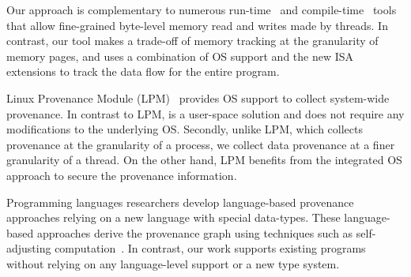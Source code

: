  Our approach is complementary to numerous run-time~\cite{memtrace} and compile-time~\cite{cgo-compiler-provenance} tools that allow fine-grained byte-level memory read and writes made by threads. In contrast, our tool makes a trade-off of memory tracking at the granularity of memory pages, and uses a combination of OS support and the new ISA extensions to track the data flow for the entire program. 


 Linux Provenance Module (LPM)~\cite{lpm} provides OS support to collect system-wide provenance. In contrast to LPM, \projecttitle is a user-space solution and does not require any modifications to the underlying OS. Secondly, unlike LPM, which collects provenance at the granularity of a process, we collect data provenance at a finer granularity of a thread.  On the other hand, LPM benefits from the integrated OS approach to secure the provenance information. 

 Programming languages researchers develop language-based provenance approaches relying on a new language with special data-types. These language-based approaches derive the provenance graph using techniques such as self-adjusting computation~\cite{Acar05}. In contrast, our work supports existing programs without relying on any language-level support or a new type system.



